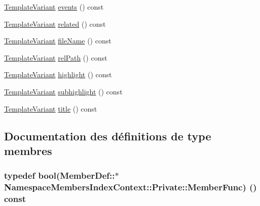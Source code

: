 \begin{DoxyCompactItemize}
\item 
\hyperlink{class_template_variant}{Template\+Variant} \hyperlink{class_namespace_members_index_context_1_1_private_ae5f79afe0bfdc5a444ecaff5e6950145}{events} () const 
\item 
\hyperlink{class_template_variant}{Template\+Variant} \hyperlink{class_namespace_members_index_context_1_1_private_a80cea11a6dbaad8630a85e6c442da04b}{related} () const 
\item 
\hyperlink{class_template_variant}{Template\+Variant} \hyperlink{class_namespace_members_index_context_1_1_private_ad6951e680d0442a7fd9e197d06eb60e3}{file\+Name} () const 
\item 
\hyperlink{class_template_variant}{Template\+Variant} \hyperlink{class_namespace_members_index_context_1_1_private_afdc8ea714b300d98a6592c89b2b315b3}{rel\+Path} () const 
\item 
\hyperlink{class_template_variant}{Template\+Variant} \hyperlink{class_namespace_members_index_context_1_1_private_a59915cbefb13d8e8d1f2c3ce8f16f0b6}{highlight} () const 
\item 
\hyperlink{class_template_variant}{Template\+Variant} \hyperlink{class_namespace_members_index_context_1_1_private_a644706de3c8b5f46e849195e0f7a7b9d}{subhighlight} () const 
\item 
\hyperlink{class_template_variant}{Template\+Variant} \hyperlink{class_namespace_members_index_context_1_1_private_a0c7abddb6121d225fd5896cc4b6bb5fb}{title} () const 
\end{DoxyCompactItemize}


\subsection{Documentation des définitions de type membres}
\hypertarget{class_namespace_members_index_context_1_1_private_a40a77005bcf88756302b2ebf92a88a8e}{}
\subsubsection[{Member\+Func}]{\setlength{\rightskip}{0pt plus 5cm}typedef {\bf bool}(Member\+Def\+::$\ast$ Namespace\+Members\+Index\+Context\+::\+Private\+::\+Member\+Func) () const }\label{class_namespace_members_index_context_1_1_private_a40a77005bcf88756302b2ebf92a88a8e}


